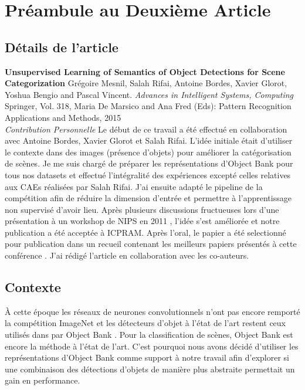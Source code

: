 \chapter{Pr\'{e}ambule au Deuxi\`{e}me Article }

\section{D\'{e}tails de l'article}

{ \bf Unsupervised Learning of Semantics of Object Detections for Scene
Categorization} Gr\'{e}goire Mesnil, Salah Rifai, Antoine Bordes, Xavier
Glorot, Yoshua Bengio and Pascal Vincent.  { \it Advances in Intelligent
Systems, Computing} Springer, Vol.  318, Maria De Marsico and Ana Fred (Eds):
Pattern Recognition Applications and Methods, 2015\\ 

{\it Contribution Personnelle} Le d\'{e}but de ce travail a \'{e}t\'{e}
effectu\'{e} en collaboration avec Antoine Bordes, Xavier Glorot et Salah
Rifai. L'id\'{e}e initiale \'{e}tait d'utiliser le contexte dans des images
(pr\'{e}sence d'objets) pour am\'{e}liorer la cat\'{e}gorisation de sc\`{e}nes.
Je me suis charg\'{e} de pr\'{e}parer les repr\'{e}sentations d'Object Bank
pour tous nos datasets et effectu\'{e} l'int\'{e}gralit\'{e} des
exp\'{e}riences except\'{e} celles relatives aux CAEs r\'{e}alis\'{e}es par
Salah Rifai. J'ai ensuite adapt\'{e} le pipeline de la comp\'{e}tition afin de
r\'{e}duire la dimension d'entr\'{e}e et permettre \`{a} l'apprentissage non
supervis\'{e} d'avoir lieu.  Apr\`{e}s plusieurs discussions fructueuses lors
d'une pr\'{e}sentation \`{a} un workshop de NIPS en 2011
\citep{Mesnil-workshop-nips}, l'id\'{e}e s'est am\'{e}lior\'{e}e et notre
publication \citep{Mesnil-icpram} a \'{e}t\'{e} accept\'{e}e \`{a} ICPRAM.
Apr\`{e}s l'oral, le papier a \'{e}t\'{e} selectionn\'{e} pour publication dans
un recueil contenant les meilleurs papiers pr\'{e}sent\'{e}s \`{a} cette
conf\'{e}rence \citep{Mesnil-icpram-journal}. J'ai r\'{e}dig\'{e} l'article en
collaboration avec les co-auteurs.

\section{Contexte}

\`{A} cette \'{e}poque les r\'{e}seaux de neurones convolutionnels n'ont pas
encore remport\'{e} la comp\'{e}tition ImageNet \citep{Krizhevsky-2012-small} et les
d\'{e}tecteurs d'objet \`{a} l'\'{e}tat de l'art restent ceux utilisés dans par
Object Bank \citep{lsvm-pami}. Pour la classification de sc\`{e}nes, Object
Bank est encore la m\'{e}thode \`{a} l'\'{e}tat de l'art.  C'est pourquoi nous
avons d\'{e}cid\'{e} d'utiliser les repr\'{e}sentations d'Object Bank comme
support \`{a} notre travail afin d'explorer si une combinaison des
d\'{e}tections d'objets de mani\`{e}re plus abstraite permettait un gain en
performance.


